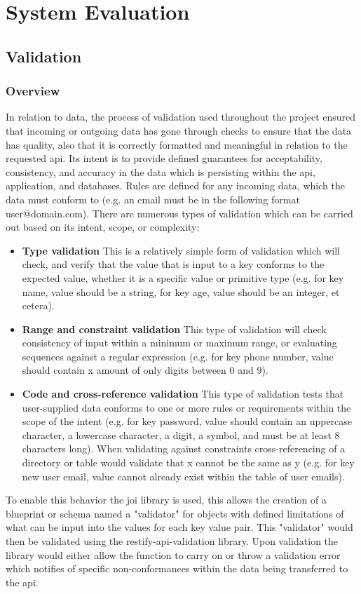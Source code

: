 \chapter{System Evaluation}
	
\section{Validation}
\subsection{Overview}
	In relation to data, the process of validation used throughout the project ensured that incoming or outgoing data has gone through checks to ensure that the data has quality, also that it is correctly formatted and meaningful in relation to the requested api\cite{validationwiki}. Its intent is to provide defined guarantees for acceptability, consistency, and accuracy in the data which is persisting within the api, application, and databases. Rules are defined for any incoming data, which the data must conform to (e.g. an email must be in the following format user@domain.com). There are numerous types of validation which can be carried out based on its intent, scope, or complexity:
	\begin{itemize}
	\item \textbf{Type validation} This is a relatively simple form of validation which will check, and verify that the value that is input to a key conforms to the expected value, whether it is a specific value or primitive type (e.g. for key name, value should be a string, for key age, value should be an integer, et cetera)\cite{validationwiki}. 
    \item \textbf{Range and constraint validation} This type of validation will check consistency of input within a minimum or maximum range, or evaluating sequences against a regular expression (e.g. for key phone number, value should contain x amount of only digits between 0 and 9)\cite{validationwiki}.
    \item \textbf{Code and cross-reference validation} This type of validation tests that user-supplied data conforms to one or more rules or requirements within the scope of the intent (e.g. for key password, value should contain an uppercase character, a lowercase character, a digit, a symbol, and must be at least 8 characters long). When validating against constraints cross-referencing of a directory or table would validate that x cannot be the same as y (e.g. for key new user email, value cannot already exist within the table of user emails)\cite{validationwiki}.
	\end{itemize}
    To enable this behavior the joi library is used, this allows the creation of a blueprint or schema named a "validator" for objects with defined limitations of what can be input into the values for each key value pair. This "validator" would then be validated using the restify-api-validation library. Upon validation the library would either allow the function to carry on or throw a validation error which notifies of specific non-conformances within the data being transferred to the api\cite{hapijs}. 

